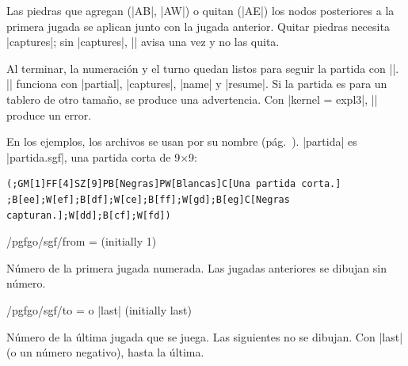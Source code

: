 Las piedras que agregan (|AB|, |AW|) o quitan (|AE|) los nodos posteriores a la primera jugada se aplican junto con la jugada anterior. Quitar piedras necesita |captures|; sin |captures|, |\sgf| avisa una vez y no las quita.

Al terminar, la numeración y el turno quedan listos para seguir la partida con |\moves|. |\sgf| funciona con |partial|, |captures|, |name| y |resume|. Si la partida es para un tablero de otro tamaño, se produce una advertencia. Con |kernel = expl3|, |\sgf| produce un error.

En los ejemplos, los archivos se usan por su nombre (pág.~\pageref{subsec:sgfnombres}). |partida| es |partida.sgf|, una partida corta de 9$\times$9:
\begin{verbatim}
(;GM[1]FF[4]SZ[9]PB[Negras]PW[Blancas]C[Una partida corta.]
;B[ee];W[ef];B[df];W[ce];B[ff];W[gd];B[eg]C[Negras capturan.];W[dd];B[cf];W[fd])
\end{verbatim}

\begin{codeexample}[width=5cm]
	\begin{goban}[label = {at = {north, west}}]
	\end{goban}
\end{codeexample}

\begin{codeexample}[width=5cm]
	\begin{goban}[label = {at = {north, west}}, captures]
	\end{goban}
\end{codeexample}

\begin{key}{/pgfgo/sgf/from =  (initially 1)}

	Número de la primera jugada numerada. Las jugadas anteriores se dibujan sin número.

	\begin{codeexample}[width=5cm]
		\begin{goban}[captures]
		\end{goban}
	\end{codeexample}
\end{key}

\begin{key}{/pgfgo/sgf/to =  o |last| (initially last)}

	Número de la última jugada que se juega. Las siguientes no se dibujan. Con |last| (o un número negativo), hasta la última.

	\begin{codeexample}[width=5cm]
		\begin{goban}[captures]
		\end{goban}
	\end{codeexample}
\end{key}


